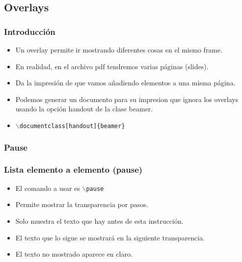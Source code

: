 \documentclass[aspectratio=43]{beamer}%
\newcommand\rojo[1]{\textcolor[RGB]{237,41,57}{#1}}
\begin{document}
\subsection{Overlays}
\begin{frame}[fragile]
\frametitle{\textbf{Introducción}}
\justifying
 \begin{itemize}\justifying
  \item Un overlay permite ir mostrando diferentes cosas en el mismo frame.
  \item En realidad, en el archivo pdf tendremos varias páginas (slides).
  \item Da la impresión de que vamos añadiendo elementos a una misma página.
  \item Podemos generar un documento para su impresion que ignora los overlays usando la opción handout de la clase beamer.
  \item []\texttt{$\backslash$documentclass\rojo{[handout]}\{beamer\}}
\end{itemize}

\end{frame}

\subsubsection{Pause}
\begin{frame}[fragile]
\frametitle{\textbf{Lista elemento a elemento (pause)}}
\justifying
 \begin{itemize}\justifying
  \item El comando a usar es \texttt{$\backslash$pause}
  \item Permite mostrar la transparencia por pasos.
  \item Solo muestra el texto que hay antes de esta instrucción.
  \item El texto que lo sigue se mostrará en la siguiente transparencia.
  \item El texto no mostrado aparece en claro.
\end{itemize}

\end{frame}
\end{document}
